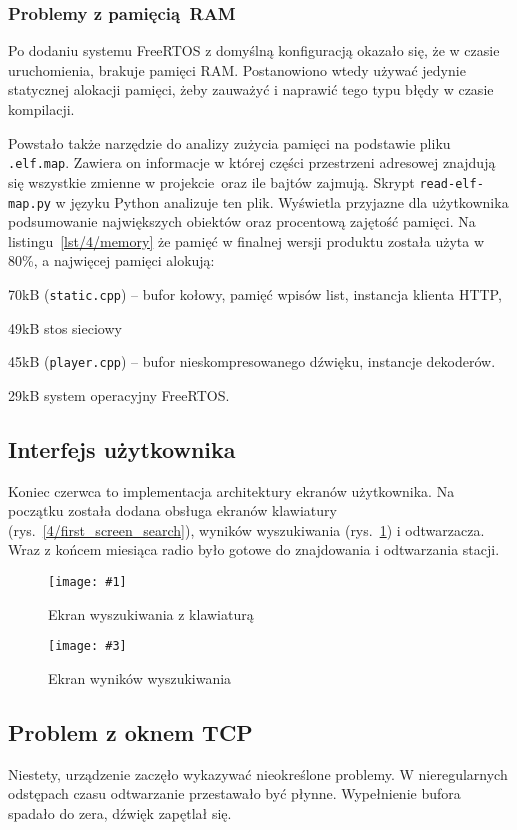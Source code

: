 \documentclass[polish]{aghengthesis}
\let\tempone\itemize
\let\temptwo\enditemize
\renewenvironment{itemize}{\tempone\setlength{\itemsep}{0cm}}{\temptwo}
\newcommand{\imgintss}[5]{
	\begin{figure}[{#5}]
		\centering
		\begin{minipage}{.45\textwidth}
			\centering
			\texttt{[image: \#1]}
			\caption{#2}
			\label{#1}
		\end{minipage}%
		\hfill
		\begin{minipage}{.45\textwidth}
			\centering
			\texttt{[image: \#3]}
			\caption{#4}
			\label{#3}
		\end{minipage}
	\end{figure}
}
\newcommand{\imghss}[4]{\imgintss{#1}{#2}{#3}{#4}{H}}
\newcommand{\lstfile}[3]{
	\noindent
	\hspace{0.1\linewidth}
	\begin{minipage}{0.8\linewidth}
		
	\end{minipage}
	\vspace{0.3cm}
}
\begin{document}
			\subsubsection{Problemy z pamięcią RAM}
				Po dodaniu systemu FreeRTOS z domyślną konfiguracją okazało się, że w czasie uruchomienia, brakuje pamięci RAM.
				Postanowiono wtedy używać jedynie statycznej alokacji pamięci, żeby zauważyć i naprawić tego typu błędy w czasie kompilacji.

				Powstało także narzędzie do analizy zużycia pamięci na podstawie pliku \lstinline|.elf.map|. Zawiera on informacje w której części przestrzeni adresowej znajdują się wszystkie zmienne w projekcie oraz ile bajtów zajmują. Skrypt \lstinline|read-elf-map.py| w języku Python analizuje ten plik. Wyświetla przyjazne dla użytkownika podsumowanie największych obiektów oraz procentową zajętość pamięci. Na listingu~\ref{lst/4/memory} że pamięć w finalnej wersji produktu została użyta w 80\%, a najwięcej pamięci alokują:
				\begin{itemize}
					\item 70kB (\lstinline|static.cpp|) -- bufor kołowy, pamięć wpisów list, instancja klienta HTTP,
					\item 49kB stos sieciowy
					\item 45kB (\lstinline|player.cpp|) -- bufor nieskompresowanego dźwięku, instancje dekoderów.
					\item 29kB system operacyjny FreeRTOS.
				\end{itemize}
				
				\lstfile{default}{Zajętość pamięci RAM}{lst/4/memory}
			
		\subsection{Interfejs użytkownika}
			Koniec czerwca to implementacja architektury ekranów użytkownika. Na początku została dodana obsługa ekranów klawiatury (rys.~\ref{4/first_screen_search}), wyników wyszukiwania (rys.~\ref{4/first_screen_res}) i odtwarzacza. Wraz z końcem miesiąca radio było gotowe do znajdowania i odtwarzania stacji.
			
			\imghss{4/first_screen_search}{Ekran wyszukiwania z klawiaturą}{4/first_screen_res}{Ekran wyników wyszukiwania}
			
		\subsection{Problem z oknem TCP}
			Niestety, urządzenie zaczęło wykazywać nieokreślone problemy. W nieregularnych odstępach czasu odtwarzanie przestawało być płynne. Wypełnienie bufora spadało do zera, dźwięk zapętlał się.
			$ $\\
			
\end{document}
